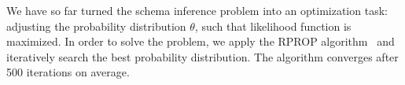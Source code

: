 We have so far turned the schema inference problem into an optimization task: 
adjusting the probability distribution $\theta$, 
such that likelihood function is maximized. 
In order to solve the problem, we apply the RPROP 
algorithm~\cite{riedmiller1993direct}
and iteratively search the best probability distribution.
The algorithm converges after 500 iterations on average.

%
%
